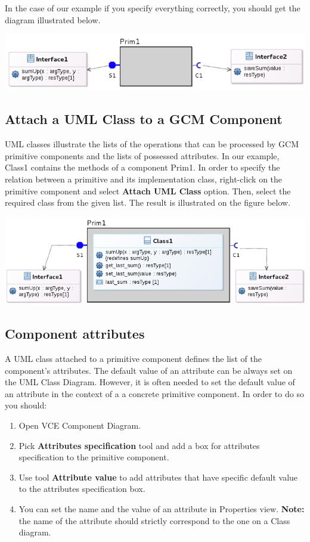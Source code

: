 \documentclass[12pt]{article}
\begin{document}
In the case of our example if you specify everything correctly, you should get the diagram illustrated below.

     \centerline{
     \includegraphics[width=14cm]{draws/itfs.png}
     \label{fig:vce-proj}
     }
     
\subsection{Attach a UML Class to a GCM Component}
UML classes illustrate the lists of the operations that can be processed by GCM primitive components and the lists of possessed attributes. In our example, Class1 contains the methods of a component Prim1. In order to specify the relation between a primitive and its implementation class, right-click on the primitive component and select \textbf{Attach UML Class} option. Then, select the required class from the given list. The result is illustrated on the figure below.

     \centerline{
     \includegraphics[width=14cm]{draws/prim-class.png}
     \label{fig:vce-proj}
     }

\subsection{Component attributes}
A UML class attached to a primitive component defines the list of the component's attributes. The default value of an attribute can be always set on the UML Class Diagram. However, it is often needed to set the default value of an attribute in the context of a a concrete primitive component. In order to do so you should:

\begin{enumerate}
\item
Open VCE Component Diagram.
\item 
Pick \textbf{Attributes specification} tool and add a box for attributes specification to the primitive component.
\item
Use tool \textbf{Attribute value} to add attributes that have specific default value to the attributes specification box. 
\item
You can set the name and the value of an attribute in Properties view. \textbf{Note:} the name of the attribute should strictly correspond to the one on a Class diagram.
\end{enumerate}
\end{document}
